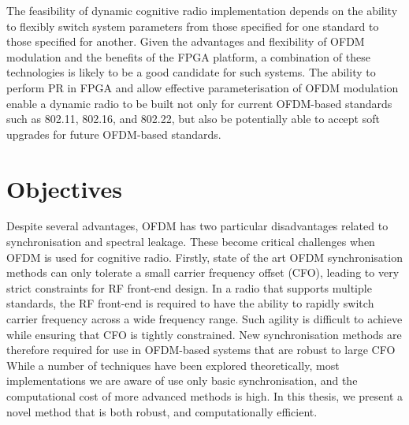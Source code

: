 The feasibility of dynamic cognitive radio implementation depends on the ability to flexibly switch system parameters from those specified for one standard to those specified for another.
Given the advantages and flexibility of OFDM modulation and the benefits of the FPGA platform, a combination of these technologies is likely to be a good candidate for such systems.
The ability to perform PR in FPGA and allow effective parameterisation of OFDM modulation enable a dynamic radio to be built not only for current OFDM-based standards such as 802.11, 802.16, and 802.22, but also be potentially able to accept soft upgrades for future OFDM-based standards.

\section{Objectives}

Despite several advantages, OFDM has two particular disadvantages related to synchronisation and spectral leakage. These become critical challenges when OFDM is used for cognitive radio.
Firstly, state of the art OFDM synchronisation methods can only tolerate a small carrier frequency offset (CFO),  leading to very strict constraints for RF front-end design.
In a radio that supports multiple standards, the RF front-end is required to have the ability to rapidly switch carrier frequency across a wide frequency range.
Such agility is difficult to achieve while ensuring that CFO is tightly constrained.
New synchronisation methods are therefore required for use in OFDM-based  systems that are robust to large CFO
While a number of techniques have been explored theoretically, most implementations we are aware of use only basic synchronisation, and the computational cost of more advanced methods is high.
In this thesis, we present a novel method that is both robust, and computationally efficient.

